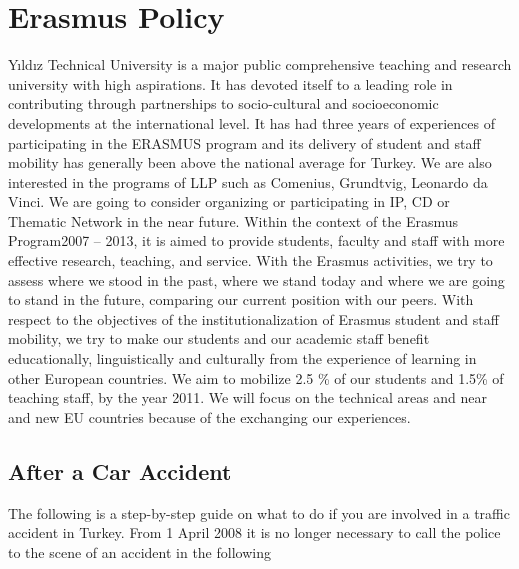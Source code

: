 \chapter{Erasmus Policy}
Yıldız Technical University is a major public comprehensive teaching and research university with high aspirations. It has devoted itself to a leading role in contributing through partnerships to socio-cultural and socioeconomic developments at the international level. It has had three years of experiences of participating in the ERASMUS program and its delivery of student and staff mobility has generally been above the national average for Turkey. We are also interested in the programs of LLP such as Comenius, Grundtvig, Leonardo da Vinci. We are going to consider organizing or participating in IP, CD or Thematic Network in the near future. Within the context of the Erasmus Program2007 – 2013, it is aimed to provide students, faculty and staff with more effective research, teaching, and service. With the Erasmus activities, we try to assess where we stood in the past, where we stand today and where we are going to stand in the future, comparing our current position with our peers. With respect to the objectives of the institutionalization of Erasmus student and staff mobility, we try to make our students and our academic staff benefit educationally, linguistically and culturally from the experience of learning in other European countries. We aim to mobilize 2.5 \% of our students and 1.5\% of teaching staff, by the year 2011. We will focus on the technical areas and near and new EU countries because of the exchanging our experiences.

\section{After a Car Accident}
The following is a step-by-step guide on what to do if you are involved in a traffic accident in Turkey.
From 1 April 2008 it is no longer necessary to call the police to the scene of an accident in the following
